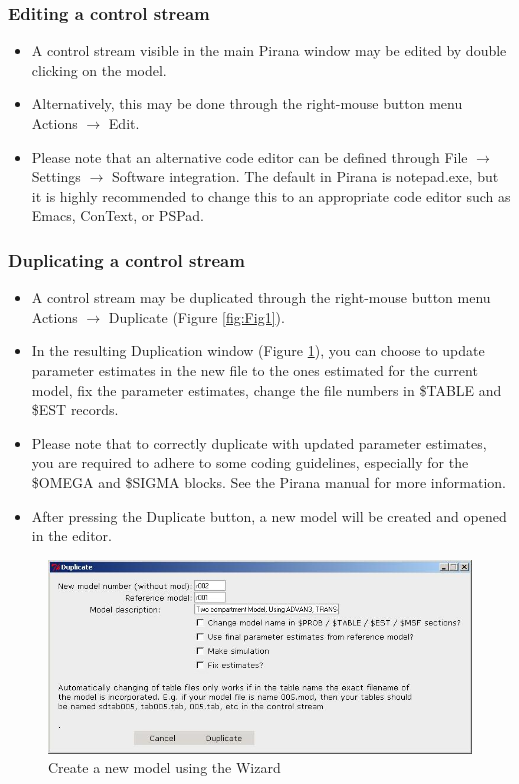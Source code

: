 \subsubsection*{Editing  a control stream}
\begin{itemize}
\item A control stream visible in the main Pirana window may be edited by double clicking on the model.
\item Alternatively, this may be done through the right-mouse button menu Actions $ \rightarrow$ Edit.
\item Please note that an alternative code editor can be defined
  through File $ \rightarrow$ Settings $ \rightarrow$ Software
  integration. The default in Pirana is notepad.exe, but it is highly
  recommended to change this to an appropriate code editor such as
  Emacs, ConText, or PSPad.
\end{itemize}

\subsubsection*{Duplicating a control stream}
\begin{itemize}
\item A control stream may be duplicated through the right-mouse
  button menu Actions $ \rightarrow$ Duplicate (Figure \ref{fig:Fig1}).
\item In the resulting Duplication window (Figure \ref{fig:Fig6}), you can choose
  to update parameter estimates in the new file to the ones estimated
  for the current model, fix the parameter estimates, change the
  file numbers in \$TABLE and \$EST records.
\item Please note that to correctly duplicate with updated parameter
  estimates, you are required to adhere to some coding guidelines,
  especially for the \$OMEGA and \$SIGMA blocks. See the Pirana manual
  for more information.
\item After pressing the Duplicate button, a new model will be created
  and opened in the editor.
\end{itemize}

\begin{figure}[h] \centering
    \includegraphics[scale=.5]{images/working_6.jpg}
    \caption{Create a new model using the Wizard\label{fig:Fig6}}
\end{figure}

